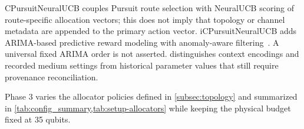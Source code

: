 
CPursuitNeuralUCB couples Pursuit route selection with NeuralUCB scoring of route-specific allocation vectors; this does not imply that topology or channel metadata are appended to the primary action vector. iCPursuitNeuralUCB adds ARIMA-based predictive reward modeling with anomaly-aware filtering~\cite{box2015time}. A universal fixed ARIMA order is not asserted.  distinguishes context encodings and recorded medium settings from historical parameter values that still require provenance reconciliation.

Phase 3 varies the allocator policies defined in \cref{subsec:topology} and summarized in \cref{tab:config_summary,tab:setup-allocators} while keeping the physical budget fixed at 35 qubits.

